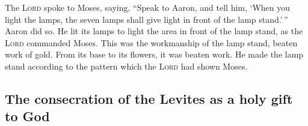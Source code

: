  The \textsc{Lord} spoke to Moses, saying, 
``Speak to Aaron, and tell him, `When you light the lamps, the seven
lamps shall give light in front of the lamp stand.'\,'' 
Aaron did so. He lit its lamps to light the area in front of the lamp
stand, as the \textsc{Lord} commanded Moses.  This was the
workmanship of the lamp stand, beaten work of gold. From its base to its
flowers, it was beaten work. He made the lamp stand according to the
pattern which the \textsc{Lord} had shown Moses.

\hypertarget{the-consecration-of-the-levites-as-a-holy-gift-to-god}{%
\subsection{The consecration of the Levites as a holy gift to
God}\label{the-consecration-of-the-levites-as-a-holy-gift-to-god}}

